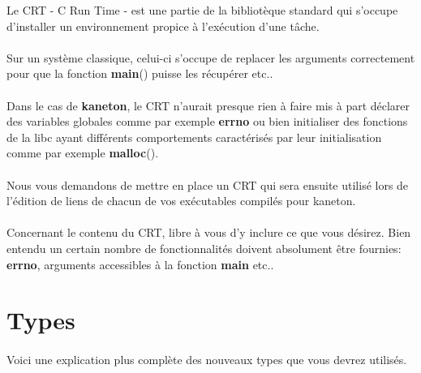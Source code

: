 \documentclass[10pt,a4wide]{article}
\begin{document}
Le CRT - C Run Time - est une partie de la bibliot\`eque standard qui s'occupe
d'installer un environnement propice \`a l'ex\'ecution d'une t\^ache.

\paragraph{}

Sur un syst\`eme classique, celui-ci s'occupe de replacer les arguments
correctement pour que la fonction \textbf{main}() puisse les r\'ecup\'erer
etc..

\paragraph{}

Dans le cas de \textbf{kaneton}, le CRT n'aurait presque rien \`a faire
mis \`a part d\'eclarer des variables globales comme par exemple
\textbf{errno} ou bien initialiser des fonctions de la libc ayant diff\'erents
comportements caract\'eris\'es par leur initialisation comme par exemple
\textbf{malloc}().

\paragraph{}

Nous vous demandons de mettre en place un CRT qui sera ensuite utilis\'e
lors de l'\'edition de liens de chacun de vos ex\'ecutables compil\'es
pour kaneton.

\paragraph{}

Concernant le contenu du CRT, libre \`a vous d'y inclure ce que vous
d\'esirez. Bien entendu un certain nombre de fonctionnalit\'es doivent
absolument \^etre fournies: \textbf{errno}, arguments accessibles \`a
la fonction \textbf{main} etc..

\section{Types}

\paragraph{}

Voici une explication plus compl\`ete des nouveaux types que
vous devrez utilis\'es.
\end{document}
